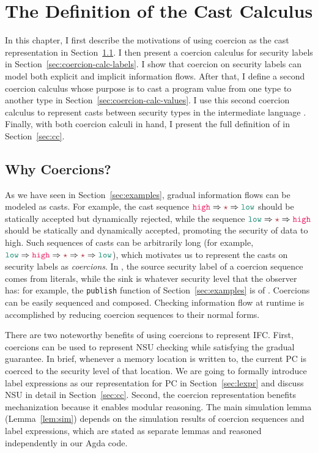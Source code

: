 \chapter{The Definition of the Cast Calculus \CC}
\label{ch:sem}

{\color{NavyBlue} %

In this chapter, I first describe the motivations of using coercion as the cast
representation in Section~\ref{sec:why-coercions}. I then present a coercion
calculus for security labels in Section~\ref{sec:coercion-calc-labels}. I show
that coercion on security labels can model both explicit and implicit
information flows. After that, I define a second coercion calculus whose purpose
is to cast a program value from one type to another type in
Section~\ref{sec:coercion-calc-values}. I use this second coercion calculus to
represent casts between security types in the intermediate language \CC.
Finally, with both coercion calculi in hand, I present the full definition of
\CC in Section~\ref{sec:cc}.

\section{Why Coercions?}
\label{sec:why-coercions}

As we have seen in Section~\ref{sec:examples}, gradual information flows can be
modeled as casts. For example, the cast sequence $\high \Rightarrow \unk
\Rightarrow \low$ should be statically accepted but dynamically rejected, while
the sequence $\low \Rightarrow \unk \Rightarrow \high$ should be statically and
dynamically accepted, promoting the security of data to high. Such sequences of
casts can be arbitrarily long (for example, $\low \Rightarrow \high \Rightarrow
\unk \Rightarrow \unk \Rightarrow \low$), which motivates us to represent the
casts on security labels as \textit{coercions}. In \Surface, the source security
label of a coercion sequence comes from literals, while the sink is whatever
security level that the observer has: for example, the \texttt{publish} function
of Section~\ref{sec:examples} is of \low. Coercions can be easily sequenced and
composed. Checking information flow at runtime is accomplished by reducing
coercion sequences to their normal forms.

There are two noteworthy benefits of using coercions to represent IFC. First,
coercions can be used to represent NSU checking while satisfying the gradual
guarantee. In brief, whenever a memory location is written to, the current PC is
coerced to the security level of that location. We are going to formally
introduce label expressions as our representation for PC in
Section~\ref{sec:lexpr} and discuss NSU in detail in Section~\ref{sec:cc}.
Second, the coercion representation benefits mechanization because it enables
modular reasoning. The main simulation lemma (Lemma~\ref{lem:sim}) depends on
the simulation results of coercion sequences and label expressions, which are
stated as separate lemmas and reasoned independently in our Agda code.

} %

